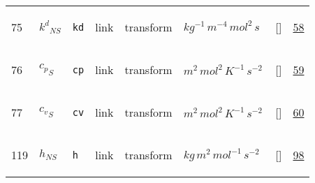 \begin{longtable}{|p{1cm}|p{3cm}|p{3cm}|p{7cm}|p{3.0cm}|p{3cm}|p{2cm}|p{1cm}|}
                 \\
    75
             & \hypertarget{"v:75"}{ $ {k^{d}}_{{N S}} $}
             & \verb|kd|
             & link
             & \begin{lay}transform \end{lay}
             & $ kg^{-1} \,m^{-4} \,mol^{2} \,s \, $
             & []
             & \hyperlink{"e:58"}{ 58 }
                 \\
    76
             & \hypertarget{"v:76"}{ $ {c_p}_{S} $}
             & \verb|cp|
             & link
             & \begin{lay}transform \end{lay}
             & $ m^{2} \,mol^{2} \,K^{-1} \,s^{-2} \, $
             & []
             & \hyperlink{"e:59"}{ 59 }
                 \\
    77
             & \hypertarget{"v:77"}{ $ {c_v}_{S} $}
             & \verb|cv|
             & link
             & \begin{lay}transform \end{lay}
             & $ m^{2} \,mol^{2} \,K^{-1} \,s^{-2} \, $
             & []
             & \hyperlink{"e:60"}{ 60 }
                 \\
    119
             & \hypertarget{"v:119"}{ $ {h}_{{N S}} $}
             & \verb|h|
             & link
             & \begin{lay}transform \end{lay}
             & $ kg \,m^{2} \,mol^{-1} \,s^{-2} \, $
             & []
             & \hyperlink{"e:98"}{ 98 }
                 \\
    \end{longtable}